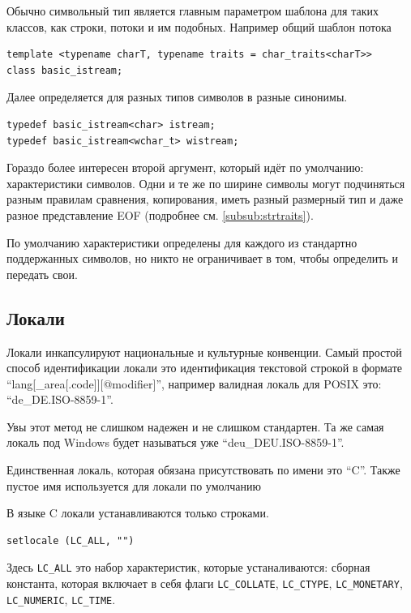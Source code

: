 \documentclass[a4paper,12pt,oneside]{book}
\begin{document}
Обычно символьный тип является главным параметром шаблона для таких классов, как строки, потоки и им подобных. Например общий шаблон потока

\begin{lstlisting}
template <typename charT, typename traits = char_traits<charT>>
class basic_istream;
\end{lstlisting}

Далее определяется для разных типов символов в разные синонимы.

\begin{lstlisting}
typedef basic_istream<char> istream;
typedef basic_istream<wchar_t> wistream;
\end{lstlisting}

Гораздо более интересен второй аргумент, который идёт по умолчанию: характеристики символов. Одни и те же по ширине символы могут подчиняться разным правилам сравнения, копирования, иметь разный размерный тип и даже разное представление EOF (подробнее см. \ref{subsub:strtraits}).

По умолчанию характеристики определены для каждого из стандартно поддержанных символов, но никто не ограничивает в том, чтобы определить и передать свои.

\subsection{Локали}\label{subsubsec:locales}

Локали инкапсулируют национальные и культурные конвенции. Самый простой способ идентификации локали это идентификация текстовой строкой в формате ``lang[\_area[.code]][@modifier]'', например валидная локаль для POSIX это: ``de\_DE.ISO-8859-1''.

Увы этот метод не слишком надежен и не слишком стандартен. Та же самая локаль под Windows будет называться уже ``deu\_DEU.ISO-8859-1''.

Единственная локаль, которая обязана присутствовать по имени это ``C''. Также пустое имя используется для локали по умолчанию

В языке C локали устанавливаются только строками.

\begin{lstlisting}
setlocale (LC_ALL, "")
\end{lstlisting}

Здесь \lstinline!LC_ALL! это набор характеристик, которые устаналиваются: сборная константа, которая включает в себя флаги \lstinline!LC_COLLATE!, \lstinline!LC_CTYPE!, \lstinline!LC_MONETARY!, \lstinline!LC_NUMERIC!, \lstinline!LC_TIME!.
\end{document}
